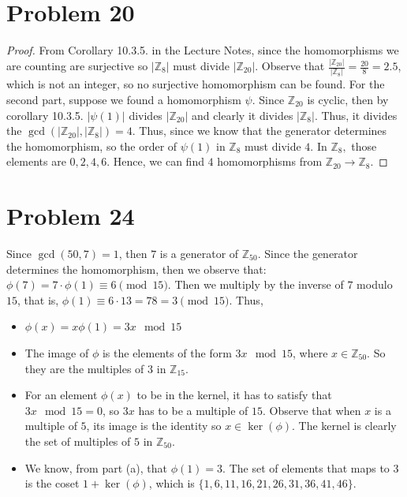 \documentclass[a4paper,12pt]{article}
\begin{document}
\section*{Problem 20}
\begin{proof}
    From Corollary 10.3.5. in the Lecture Notes, since the homomorphisms we are counting are surjective so $|\mathbb{Z}_8|$ must divide $|\mathbb{Z}_{20}|$. Observe that $\frac{|\mathbb{Z}_{20}|}{|\mathbb{Z}_8|}=\frac{20}{8}=2.5$, which is not an integer, so no surjective homomorphism can be found.
    For the second part, suppose we found a homomorphism $\psi$. Since $\mathbb{Z}_{20}$ is cyclic, then by corollary 10.3.5. $|\psi(1)|$ divides $|\mathbb{Z}_{20}|$ and clearly it divides $|\mathbb{Z}_8|$. Thus, it divides the $\operatorname{gcd}(|\mathbb{Z}_{20}|,|\mathbb{Z}_8|)=4.$
    Thus, since we know that the generator determines the homomorphism, so the order of $\psi(1)$ in $\mathbb{Z}_8$ must divide $4.$ In $\mathbb{Z}_8,$ those elements are $0,2,4,6$. Hence, we can find $4$ homomorphisms from $\mathbb{Z}_{20} \to \mathbb{Z}_8.$
\end{proof}
\section*{Problem 24}
    Since $\operatorname{gcd}(50,7)=1$, then $7$ is a generator of $\mathbb{Z}_{50}$. Since the generator determines the homomorphism, then we observe that:
    $\phi(7)=7\cdot \phi(1)\equiv 6 \pmod {15}.$ Then we multiply by the inverse of $7$ modulo $15$, that is, $\phi(1) \equiv 6\cdot 13= 78 =3\pmod {15}.$ Thus,
    \begin{itemize}
    \item $\phi(x)=x\phi(1)=3x \mod {15}$
    \item The image of $\phi$ is the elements of the form $3x \mod {15}$, where $x \in \mathbb{Z}_{50}$. So they are the multiples of $3$ in $\mathbb{Z}_{15}.$
    \item For an element $\phi(x)$ to be in the kernel, it has to satisfy that $3x \mod 15 =0$, so $3x$ has to be a multiple of $15$. Observe that when $x$ is a multiple of $5$, its image is the identity so $x \in \operatorname{ker}(\phi).$ The kernel is clearly the set of multiples of $5$ in $\mathbb{Z}_{50}.$
    \item We know, from part (a), that $\phi(1)=3$. The set of elements that maps to $3$ is the coset $1+\operatorname{ker}(\phi)$, which is $\{1, 6, 11, 16, 21, 26, 31, 36, 41, 46\}.$
    \end{itemize} 
\end{document}
